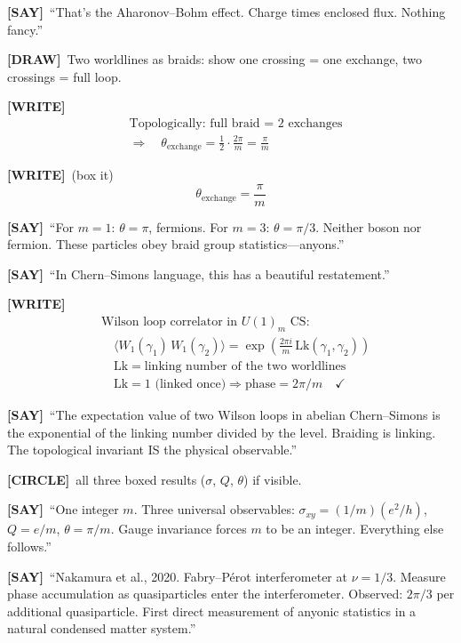 \documentclass[11pt]{article}
\newcommand{\WRITE}{\textcolor{writecol}{\textbf{[WRITE]}}}
\newcommand{\SAY}{\textcolor{saycol}{\textbf{[SAY]}}}
\newcommand{\DRAW}{\textcolor{drawcol}{\textbf{[DRAW]}}}
\newcommand{\CIRCLE}{\textcolor{boxcol}{\textbf{[CIRCLE]}}}
\begin{document}
\SAY\ ``That's the Aharonov--Bohm effect. Charge times enclosed flux. Nothing fancy.''

\DRAW\ Two worldlines as braids: show one crossing = one exchange, two crossings = full loop.

\WRITE
\begin{align*}
&\text{Topologically: full braid = 2 exchanges}\\[4pt]
&\Longrightarrow\quad \theta_{\text{exchange}} = \frac{1}{2}\cdot\frac{2\pi}{m} = \frac{\pi}{m}
\end{align*}

\WRITE\ {\large (box it)}
\begin{equation*}
\boxed{\theta_{\mathrm{exchange}} = \frac{\pi}{m}}
\end{equation*}

\SAY\ ``For $m=1$: $\theta=\pi$, fermions. For $m=3$: $\theta=\pi/3$. Neither boson nor fermion. These particles obey braid group statistics---anyons.''

\SAY\ ``In Chern--Simons language, this has a beautiful restatement.''

\WRITE
\begin{align*}
&\text{Wilson loop correlator in }U(1)_m\text{ CS:}\\[4pt]
&\quad\bigl\langle W_1(\gamma_1)\,W_1(\gamma_2)\bigr\rangle = \exp\!\left(\frac{2\pi i}{m}\,\mathrm{Lk}(\gamma_1,\gamma_2)\right)\\[6pt]
&\quad\mathrm{Lk} = \text{linking number of the two worldlines}\\[4pt]
&\quad\mathrm{Lk} = 1\text{ (linked once)} \Rightarrow \text{phase} = 2\pi/m \quad\checkmark
\end{align*}

\SAY\ ``The expectation value of two Wilson loops in abelian Chern--Simons is the exponential of the linking number divided by the level. Braiding is linking. The topological invariant IS the physical observable.''

\CIRCLE\ all three boxed results ($\sigma$, $Q$, $\theta$) if visible.

\SAY\ ``One integer $m$. Three universal observables: $\sigma_{xy} = (1/m)(e^2/h)$, $Q = e/m$, $\theta = \pi/m$. Gauge invariance forces $m$ to be an integer. Everything else follows.''

\SAY\ ``Nakamura et al., 2020. Fabry--P\'erot interferometer at $\nu = 1/3$. Measure phase accumulation as quasiparticles enter the interferometer. Observed: $2\pi/3$ per additional quasiparticle. First direct measurement of anyonic statistics in a natural condensed matter system.''
\end{document}
